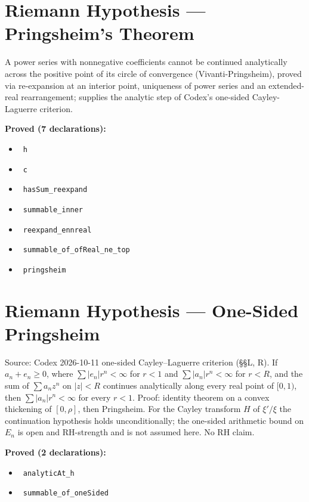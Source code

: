 \documentclass{report}
\theoremstyle{definition}
\begin{document}
\section{Riemann Hypothesis --- Pringsheim's Theorem}
A power series with nonnegative coefficients cannot be continued analytically across the positive point of its circle of convergence (Vivanti-Pringsheim), proved via re-expansion at an interior point, uniqueness of power series and an extended-real rearrangement; supplies the analytic step of Codex's one-sided Cayley-Laguerre criterion.

\noindent\textbf{Proved (7 declarations):}
\begin{itemize}
  \item {}\leanok\ \texttt{h}
  \item {}\leanok\ \texttt{c}
  \item {}\leanok\ \texttt{hasSum\_reexpand}
  \item {}\leanok\ \texttt{summable\_inner}
  \item {}\leanok\ \texttt{reexpand\_ennreal}
  \item {}\leanok\ \texttt{summable\_of\_ofReal\_ne\_top}
  \item {}\leanok\ \texttt{pringsheim}
\end{itemize}

\section{Riemann Hypothesis --- One-Sided Pringsheim}
Source: Codex 2026-10-11 one-sided Cayley--Laguerre criterion (\S\S L, R). If $a_n+e_n\ge0$, where $\sum|e_n|r^n<\infty$ for $r<1$ and $\sum|a_n|r^n<\infty$ for $r<R$, and the sum of $\sum a_nz^n$ on $|z|<R$ continues analytically along every real point of $[0,1)$, then $\sum|a_n|r^n<\infty$ for every $r<1$. Proof: identity theorem on a convex thickening of $[0,\rho]$, then Pringsheim. For the Cayley transform $H$ of $\xi'/\xi$ the continuation hypothesis holds unconditionally; the one-sided arithmetic bound on $E_n$ is open and RH-strength and is not assumed here. No RH claim.

\noindent\textbf{Proved (2 declarations):}
\begin{itemize}
  \item {}\leanok\ \texttt{analyticAt\_h}
  \item {}\leanok\ \texttt{summable\_of\_oneSided}
\end{itemize}
\end{document}
